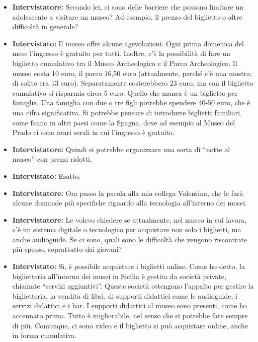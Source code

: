 \documentclass{article}
\begin{document}
\begin{itemize}
    \item \textbf{Intervistatore:} Secondo lei, ci sono delle barriere che possono limitare un adolescente a visitare un museo? Ad esempio, il prezzo del biglietto o altre difficoltà in generale?
    
    \item \textbf{Intervistato:} Il museo offre alcune agevolazioni. Ogni prima domenica del mese l’ingresso è gratuito per tutti. Inoltre, c’è la possibilità di fare un biglietto cumulativo tra il Museo Archeologico e il Parco Archeologico. Il museo costa 10 euro, il parco 16,50 euro (attualmente, perché c’è una mostra; di solito era 13 euro). Separatamente costerebbero 23 euro, ma con il biglietto cumulativo si risparmia circa 5 euro. Quello che manca è un biglietto per famiglie. Una famiglia con due o tre figli potrebbe spendere 40-50 euro, che è una cifra significativa. Si potrebbe pensare di introdurre biglietti familiari, come fanno in altri paesi come la Spagna, dove ad esempio al Museo del Prado ci sono orari serali in cui l’ingresso è gratuito.
    
    \item \textbf{Intervistatore:} Quindi si potrebbe organizzare una sorta di “notte al museo” con prezzi ridotti.
    
    \item \textbf{Intervistato:} Esatto.
    
    \item \textbf{Intervistatore:} Ora passo la parola alla mia collega Valentina, che le farà alcune domande più specifiche riguardo alla tecnologia all’interno dei musei.
    
    \item \textbf{Intervistatore:} Le volevo chiedere se attualmente, nel museo in cui lavora, c’è un sistema digitale o tecnologico per acquistare non solo i biglietti, ma anche audioguide. Se ci sono, quali sono le difficoltà che vengono riscontrate più spesso, soprattutto dai giovani?
    
    \item \textbf{Intervistato:} Sì, è possibile acquistare i biglietti online. Come ho detto, la biglietteria all’interno dei musei in Sicilia è gestita da società private, chiamate “servizi aggiuntivi”. Queste società ottengono l’appalto per gestire la biglietteria, la vendita di libri, di supporti didattici come le audioguide, i servizi didattici e i bar. I supporti didattici al museo sono presenti, come ho accennato prima. Tutto è migliorabile, nel senso che si potrebbe fare sempre di più. Comunque, ci sono video e il biglietto si può acquistare online, anche in forma cumulativa.
    

\end{itemize}
\end{document}
